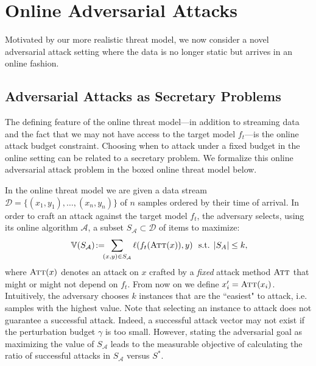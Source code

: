 \section{Online Adversarial Attacks}
\label{online_adversarial_attacks}

Motivated by our more realistic threat model, we now consider a novel adversarial attack setting where the data is no longer static but arrives in an online fashion.

\subsection{Adversarial Attacks as Secretary Problems}
\label{adv_sec_problem}
The defining feature of the online threat model---in addition to streaming data and the fact that we may not have access to the target model $f_t$---is the online attack budget constraint.
Choosing when to attack under a fixed budget in the online setting can be related to a secretary problem. We formalize this online adversarial attack problem in the boxed online threat model below.

In the online threat model we are given a data stream $\mathcal{D}=\{(x_1,y_1),\ldots,(x_n,y_n)\}$ of $n$ samples ordered by their time of arrival. In order to craft an attack against the target model $f_t$, the adversary selects, using its online algorithm $\mathcal{A}$, a subset $S_{\mathcal{A}} \subset \mathcal{D}$ of items to maximize: %
\begin{equation}\label{eq:asp}
   \mathbb{V}(S_\mathcal{A}) \! := \!\!\! \sum_{ (x,y) \in S_\mathcal{A}} \ell(f_{t}(\textsc{Att}(x)),y) \ \text{ s.t. } 
   |S_A| \leq k,\hspace{-1mm} 
\end{equation}
where $\textsc{Att}(x)$ denotes an attack on $x$ crafted by a \emph{fixed} attack method $\textsc{Att}$ that might or might not depend on $f_t$. From now on we define $x_i'=\textsc{Att}(x_i)$. 
Intuitively, the adversary chooses $k$ instances that are the ``easiest" to attack, i.e. samples with the highest value. Note that selecting an instance to attack does not guarantee a successful attack.
Indeed, a successful attack vector may not exist if the perturbation budget $\gamma$ is too small.  However, stating the adversarial goal as maximizing the value of $S_{\mathcal{A}}$ leads to the measurable objective of calculating the ratio of successful attacks in $S_{\mathcal{A}}$ versus $S^*$.

